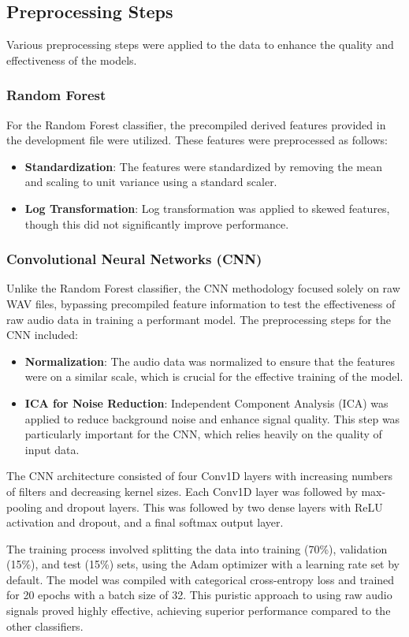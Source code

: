 \subsection{Preprocessing Steps}
Various preprocessing steps were applied to the data to enhance the quality and effectiveness of the models.

\subsubsection{Random Forest}
For the Random Forest classifier, the precompiled derived features provided in the development file were utilized. These features were preprocessed as follows:
\begin{itemize}
    \item \textbf{Standardization}: The features were standardized by removing the mean and scaling to unit variance using a standard scaler.
    \item \textbf{Log Transformation}: Log transformation was applied to skewed features, though this did not significantly improve performance.
\end{itemize}

\subsubsection{Convolutional Neural Networks (CNN)}
Unlike the Random Forest classifier, the CNN methodology focused solely on raw WAV files, bypassing precompiled feature information to test the effectiveness of raw audio data in training a performant model. The preprocessing steps for the CNN included:
\begin{itemize}
    \item \textbf{Normalization}: The audio data was normalized to ensure that the features were on a similar scale, which is crucial for the effective training of the model.
    \item \textbf{ICA for Noise Reduction}: Independent Component Analysis (ICA) was applied to reduce background noise and enhance signal quality. This step was particularly important for the CNN, which relies heavily on the quality of input data.
\end{itemize}

The CNN architecture consisted of four Conv1D layers with increasing numbers of filters and decreasing kernel sizes. Each Conv1D layer was followed by max-pooling and dropout layers. This was followed by two dense layers with ReLU activation and dropout, and a final softmax output layer.

The training process involved splitting the data into training (70\%), validation (15\%), and test (15\%) sets, using the Adam optimizer with a learning rate set by default. The model was compiled with categorical cross-entropy loss and trained for 20 epochs with a batch size of 32. This puristic approach to using raw audio signals proved highly effective, achieving superior performance compared to the other classifiers.
